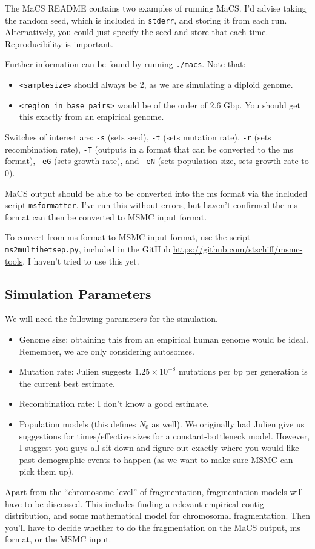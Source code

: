 \documentclass[11pt,a4paper]{article}
\begin{document}
The MaCS README contains two examples of running MaCS. I'd advise taking the random seed, which is included in \texttt{stderr}, and storing it from each run. Alternatively, you could just specify the seed and store that each time. Reproducibility is important.

Further information can be found by running \texttt{./macs}. Note that:
\begin{itemize}
\item \texttt{<samplesize>} should always be 2, as we are simulating a diploid genome.
\item \texttt{<region in base pairs>} would be of the order of 2.6 Gbp. You should get this exactly from an empirical genome.
\end{itemize}
Switches of interest are: \texttt{-s} (sets seed), \texttt{-t} (sets mutation rate), \texttt{-r} (sets recombination rate), \texttt{-T} (outputs in a format that can be converted to the ms format), \texttt{-eG} (sets growth rate), and \texttt{-eN} (sets population size, sets growth rate to 0).

MaCS output should be able to be converted into the ms format via the included script \texttt{msformatter}. I've run this without errors, but haven't confirmed the ms format can then be converted to MSMC input format.

To convert from ms format to MSMC input format, use the script \texttt{ms2multihetsep.py}, included in the GitHub \url{https://github.com/stschiff/msmc-tools}. I haven't tried to use this yet.

\subsection{Simulation Parameters}
We will need the following parameters for the simulation.
\begin{itemize}
\item Genome size: obtaining this from an empirical human genome would be ideal. Remember, we are only considering autosomes.
\item Mutation rate: Julien suggests $1.25\times 10^{-8}$ mutations per bp per generation is the current best estimate. 
\item Recombination rate: I don't know a good estimate.
\item Population models (this defines $N_0$ as well). We originally had Julien give us suggestions for times/effective sizes for a constant-bottleneck model. However, I suggest you guys all sit down and figure out exactly where you would like past demographic events to happen (as we want to make sure MSMC can pick them up).
\end{itemize}
Apart from the ``chromosome-level'' of fragmentation, fragmentation models will have to be discussed. This includes finding a relevant empirical contig distribution, and some mathematical model for chromosomal fragmentation. Then you'll have to decide whether to do the fragmentation on the MaCS output, ms format, or the MSMC input.
\end{document}
